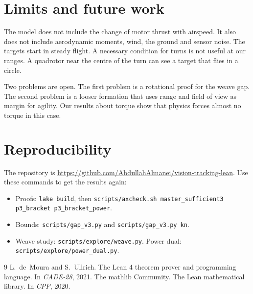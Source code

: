 \documentclass[11pt]{article}
\theoremstyle{definition}
\begin{document}
\section{Limits and future work}

The model does not include the change of motor thrust with airspeed.
It also does not include aerodynamic moments, wind, the ground and sensor noise.
The targets start in steady flight.
A necessary condition for turns is not useful at our ranges.
A quadrotor near the centre of the turn can see a target that flies in a circle.

Two problems are open.
The first problem is a rotational proof for the weave gap.
The second problem is a looser formation that uses range and field of view as margin for agility.
Our results about torque show that physics forces almost no torque in this case.

\section*{Reproducibility}

The repository is \url{https://github.com/AbdullahAlmanei/vision-tracking-lean}.
Use these commands to get the results again:
\begin{itemize}\raggedright
\item Proofs: \texttt{lake build}, then \texttt{scripts/axcheck.sh master\_sufficient3 p3\_bracket p3\_bracket\_power}.
\item Bounds: \texttt{scripts/gap\_v3.py} and \texttt{scripts/gap\_v3.py kn}.
\item Weave study: \texttt{scripts/explore/weave.py}. Power dual: \texttt{scripts/explore/power\_dual.py}.
\end{itemize}

\begin{thebibliography}{9}\small
{} L.~de~Moura and S.~Ullrich. The Lean 4 theorem prover and programming language. In
\emph{CADE-28}, 2021.
 The mathlib Community. The Lean mathematical library. In \emph{CPP}, 2020.
\end{thebibliography}
\end{document}
